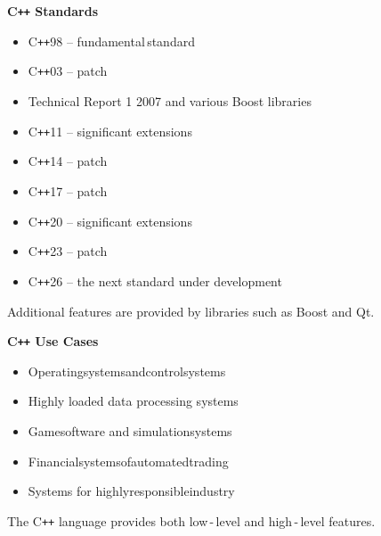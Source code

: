 \documentclass{beamer}
\begin{document}
\begin{frame}{\bf C\texttt{++} Standards}

    \begin{itemize}

        \item C\texttt{++}98 -- fundamental\,standard

        \item C\texttt{++}03 -- patch

        \item Technical Report 1 2007 and various Boost libraries

        \item C\texttt{++}11 -- significant extensions

        \item C\texttt{++}14 -- patch

        \item C\texttt{++}17 -- patch

        \item C\texttt{++}20 -- significant extensions

        \item C\texttt{++}23 -- patch

        \item C\texttt{++}26 -- the next standard under development
         
    \end{itemize}

    \begin{block}
    \justifying Additional features are provided by libraries such as Boost and Qt.
    \end{block}
    
\end{frame}

\begin{frame}{\bf C\texttt{++} Use Cases}
    
    \begin{itemize}

        \item Operating\:systems\;and\;control\:systems

        \item Highly loaded data processing systems

        \item Game\;software and simulation\;systems

        \item Financial\:systems\:of\:automated\:trading

        \item Systems for highly\;responsible\;industry
        
    \end{itemize}

    \begin{block}
    \justifying The C\texttt{++} language provides both low\,-\,level and high\,-\,level features.
    \end{block}
    
\end{frame}
\end{document}
